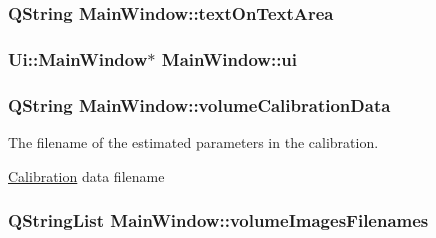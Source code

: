 \hypertarget{class_main_window_aac7c4f4184a77a56eef59fff591c9521}{
\subsubsection[{text\-On\-Text\-Area}]{\setlength{\rightskip}{0pt plus 5cm}Q\-String {\bf Main\-Window\-::text\-On\-Text\-Area}}}\label{d9/dc6/class_main_window_aac7c4f4184a77a56eef59fff591c9521}
\hypertarget{class_main_window_a35466a70ed47252a0191168126a352a5}{
\subsubsection[{ui}]{\setlength{\rightskip}{0pt plus 5cm}Ui\-::\-Main\-Window$\ast$ {\bf Main\-Window\-::ui}}}\label{d9/dc6/class_main_window_a35466a70ed47252a0191168126a352a5}
\hypertarget{class_main_window_ae44a1faf67f60347fd55e2ceebe874c3}{
\subsubsection[{volume\-Calibration\-Data}]{\setlength{\rightskip}{0pt plus 5cm}Q\-String {\bf Main\-Window\-::volume\-Calibration\-Data}}}\label{d9/dc6/class_main_window_ae44a1faf67f60347fd55e2ceebe874c3}


The filename of the estimated parameters in the calibration. 

\hyperlink{class_calibration}{Calibration} data filename \hypertarget{class_main_window_a1a88d2961b59b38eb58bffeb1a6ffe39}{
\subsubsection[{volume\-Images\-Filenames}]{\setlength{\rightskip}{0pt plus 5cm}Q\-String\-List {\bf Main\-Window\-::volume\-Images\-Filenames}}}\label{d9/dc6/class_main_window_a1a88d2961b59b38eb58bffeb1a6ffe39}


